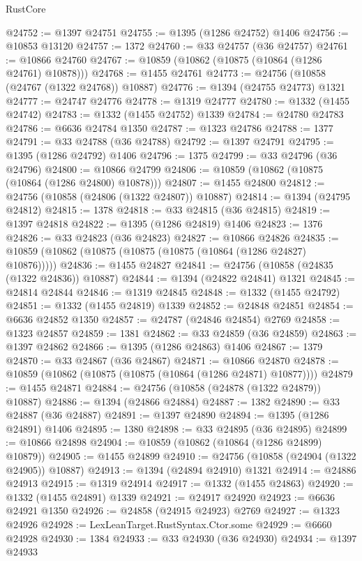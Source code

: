 \begin{lexlean}{RustCore}
\begin{coremodule}
@24752 := @1397 @24751
@24755 := @1395 (@1286 @24752) @1406
@24756 := @10853 @13120
@24757 := 1372
@24760 := @33 @24757 (@36 @24757)
@24761 := @10866 @24760
@24767 := @10859 (@10862 (@10875 (@10864 (@1286 @24761) @10878)))
@24768 := @1455 @24761
@24773 := @24756 (@10858 (@24767 (@1322 @24768)) @10887)
@24776 := @1394 (@24755 @24773) @1321
@24777 := @24747 @24776
@24778 := @1319 @24777
@24780 := @1332 (@1455 @24742)
@24783 := @1332 (@1455 @24752) @1339
@24784 := @24780 @24783
@24786 := @6636 @24784 @1350
@24787 := @1323 @24786
@24788 := 1377
@24791 := @33 @24788 (@36 @24788)
@24792 := @1397 @24791
@24795 := @1395 (@1286 @24792) @1406
@24796 := 1375
@24799 := @33 @24796 (@36 @24796)
@24800 := @10866 @24799
@24806 := @10859 (@10862 (@10875 (@10864 (@1286 @24800) @10878)))
@24807 := @1455 @24800
@24812 := @24756 (@10858 (@24806 (@1322 @24807)) @10887)
@24814 := @1394 (@24795 @24812)
@24815 := 1378
@24818 := @33 @24815 (@36 @24815)
@24819 := @1397 @24818
@24822 := @1395 (@1286 @24819) @1406
@24823 := 1376
@24826 := @33 @24823 (@36 @24823)
@24827 := @10866 @24826
@24835 := @10859 (@10862 (@10875 (@10875 (@10875 (@10864 (@1286 @24827) @10876)))))
@24836 := @1455 @24827
@24841 := @24756 (@10858 (@24835 (@1322 @24836)) @10887)
@24844 := @1394 (@24822 @24841) @1321
@24845 := @24814 @24844
@24846 := @1319 @24845
@24848 := @1332 (@1455 @24792)
@24851 := @1332 (@1455 @24819) @1339
@24852 := @24848 @24851
@24854 := @6636 @24852 @1350
@24857 := @24787 (@24846 @24854) @2769
@24858 := @1323 @24857
@24859 := 1381
@24862 := @33 @24859 (@36 @24859)
@24863 := @1397 @24862
@24866 := @1395 (@1286 @24863) @1406
@24867 := 1379
@24870 := @33 @24867 (@36 @24867)
@24871 := @10866 @24870
@24878 := @10859 (@10862 (@10875 (@10875 (@10864 (@1286 @24871) @10877))))
@24879 := @1455 @24871
@24884 := @24756 (@10858 (@24878 (@1322 @24879)) @10887)
@24886 := @1394 (@24866 @24884)
@24887 := 1382
@24890 := @33 @24887 (@36 @24887)
@24891 := @1397 @24890
@24894 := @1395 (@1286 @24891) @1406
@24895 := 1380
@24898 := @33 @24895 (@36 @24895)
@24899 := @10866 @24898
@24904 := @10859 (@10862 (@10864 (@1286 @24899) @10879))
@24905 := @1455 @24899
@24910 := @24756 (@10858 (@24904 (@1322 @24905)) @10887)
@24913 := @1394 (@24894 @24910) @1321
@24914 := @24886 @24913
@24915 := @1319 @24914
@24917 := @1332 (@1455 @24863)
@24920 := @1332 (@1455 @24891) @1339
@24921 := @24917 @24920
@24923 := @6636 @24921 @1350
@24926 := @24858 (@24915 @24923) @2769
@24927 := @1323 @24926
@24928 := LexLeanTarget.RustSyntax.Ctor.some
@24929 := @6660 @24928
@24930 := 1384
@24933 := @33 @24930 (@36 @24930)
@24934 := @1397 @24933

\end{coremodule}
\end{lexlean}
